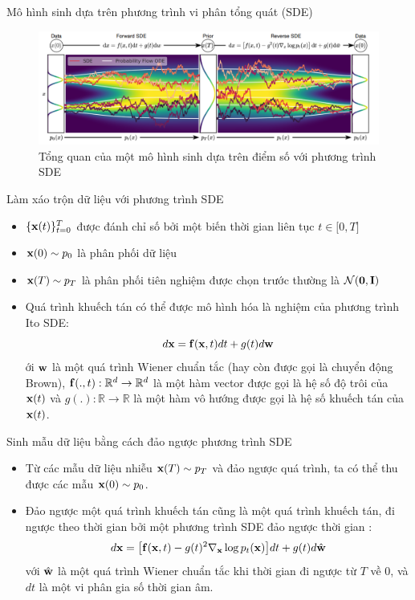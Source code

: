 \documentclass[10pt]{beamer}
\theoremstyle{remark}
\numberwithin{algocf}{section}
\numberwithin{equation}{section}
\numberwithin{dl}{section}
\numberwithin{figure}{section}
\begin{document}
\begin{frame}{Mô hình sinh dựa trên phương trình vi phân tổng quát (SDE)}
	\begin{figure}[H]
		\centering
		\includegraphics[width=\textwidth]{2.png}
		\caption{Tổng quan của một mô hình sinh dựa trên điểm số với phương trình SDE}
		\label{fig:2}
	\end{figure}
\end{frame}

\begin{frame}{Làm xáo trộn dữ liệu với phương trình SDE}
	\begin{itemize}
		\item $\lbrace \bold{x}(t) \rbrace_{t=0}^T$ được đánh chỉ số bởi một biến thời gian liên tục $t \in \lbrack 0, T \rbrack$
		\item $\bold{x}(0) \sim p_0$ là phân phối dữ liệu
		\item $\bold{x}(T) \sim p_T$ là phân phối tiên nghiệm được chọn trước thường là $\mathcal{N}(\bold{0}, \bold{I})$
		\item Quá trình khuếch tán có thể được mô hình hóa là nghiệm của phương trình Ito SDE:
		\begin{equation} \label{eq:5}
			d \bold{x} = \bold{f} (\bold{x}, t) dt + g(t) d \bold{w}
		\end{equation}
		ới $\bold{w}$ là một quá trình Wiener chuẩn tắc (hay còn được gọi là chuyển động Brown), $\bold{f}(.,t): \mathbb{R}^d \rightarrow \mathbb{R}^d$ là một hàm vector được gọi là hệ số độ trôi của $\bold{x}(t)$ và $g(.): \mathbb{R} \rightarrow \mathbb{R}$ là một hàm vô hướng được gọi là hệ số khuếch tán của $\bold{x}(t)$.
	\end{itemize}
\end{frame}

\begin{frame}{Sinh mẫu dữ liệu bằng cách đảo ngược phương trình SDE}
	\begin{itemize}
		\item Từ các mẫu dữ liệu nhiễu $\bold{x}(T) \sim p_T$ và đảo ngược quá trình, ta có thể thu được các mẫu $\bold{x}(0) \sim p_0$.
		\item Đảo ngược một quá trình khuếch tán cũng là một quá trình khuếch tán, đi ngược theo thời gian bởi một phương trình SDE đảo ngược thời gian \citep{anderson1982reverse}:
		\begin{equation} \label{eq:6}
			d \bold{x} = \big \lbrack \bold{f}(\bold{x}, t) - g(t)^2 \nabla_{\bold{x}} \log p_t (\bold{x}) \big \rbrack dt + g(t) d \hat{\bold{w}}
		\end{equation}
		với $\hat{\bold{w}}$ là một quá trình Wiener chuẩn tắc khi thời gian đi ngược từ $T$ về $0$, và $dt$ là một vi phân gia số thời gian âm.
	\end{itemize}
\end{frame}
\end{document}
